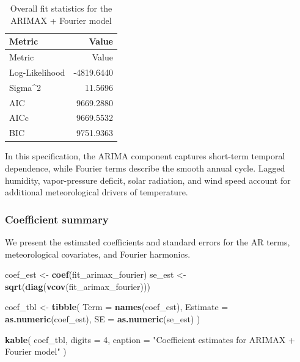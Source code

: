 \documentclass[
]{article}
\newenvironment{Shaded}{\begin{snugshade}}{\end{snugshade}}
\newcommand{\AttributeTok}[1]{\textcolor[rgb]{0.13,0.29,0.53}{#1}}
\newcommand{\DecValTok}[1]{\textcolor[rgb]{0.00,0.00,0.81}{#1}}
\newcommand{\FunctionTok}[1]{\textcolor[rgb]{0.13,0.29,0.53}{\textbf{#1}}}
\newcommand{\NormalTok}[1]{#1}
\newcommand{\OtherTok}[1]{\textcolor[rgb]{0.56,0.35,0.01}{#1}}
\newcommand{\StringTok}[1]{\textcolor[rgb]{0.31,0.60,0.02}{#1}}
\begin{document}
\begin{longtable}[]{@{}lr@{}}
\caption{Overall fit statistics for the ARIMAX + Fourier
model}\tabularnewline
\toprule\noalign{}
Metric & Value \\
\midrule\noalign{}
\endfirsthead
\toprule\noalign{}
Metric & Value \\
\midrule\noalign{}
\endhead
\bottomrule\noalign{}
\endlastfoot
Log-Likelihood & -4819.6440 \\
Sigma\^{}2 & 11.5696 \\
AIC & 9669.2880 \\
AICc & 9669.5532 \\
BIC & 9751.9363 \\
\end{longtable}

In this specification, the ARIMA component captures short-term temporal
dependence, while Fourier terms describe the smooth annual cycle. Lagged
humidity, vapor-pressure deficit, solar radiation, and wind speed
account for additional meteorological drivers of temperature.

\subsubsection{Coefficient summary}\label{coefficient-summary}

We present the estimated coefficients and standard errors for the AR
terms, meteorological covariates, and Fourier harmonics.

\begin{Shaded}
\begin{Highlighting}[]
\NormalTok{coef\_est }\OtherTok{\textless{}{-}} \FunctionTok{coef}\NormalTok{(fit\_arimax\_fourier)}
\NormalTok{se\_est   }\OtherTok{\textless{}{-}} \FunctionTok{sqrt}\NormalTok{(}\FunctionTok{diag}\NormalTok{(}\FunctionTok{vcov}\NormalTok{(fit\_arimax\_fourier)))}

\NormalTok{coef\_tbl }\OtherTok{\textless{}{-}} \FunctionTok{tibble}\NormalTok{(}
\AttributeTok{Term     =} \FunctionTok{names}\NormalTok{(coef\_est),}
\AttributeTok{Estimate =} \FunctionTok{as.numeric}\NormalTok{(coef\_est),}
\AttributeTok{SE       =} \FunctionTok{as.numeric}\NormalTok{(se\_est)}
\NormalTok{)}

\FunctionTok{kable}\NormalTok{(}
\NormalTok{coef\_tbl,}
\AttributeTok{digits =} \DecValTok{4}\NormalTok{,}
\AttributeTok{caption =} \StringTok{"Coefficient estimates for ARIMAX + Fourier model"}
\NormalTok{)}
\end{Highlighting}
\end{Shaded}
\end{document}
